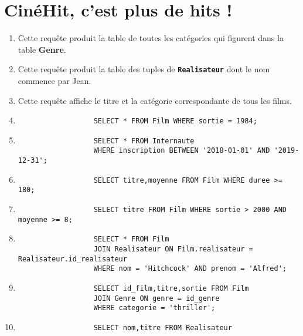 \documentclass[a4paper,10pt,article,firamath]{nsi}
\begin{document}
\section{CinéHit, c'est plus de hits !\hfill}
\begin{enumerate}
      \item Cette requête produit la table de toutes les catégories qui figurent dans la table \textbf{Genre}.       
      \item Cette requête produit la table des tuples de \texttt{\textbf{Realisateur}} dont le nom commence par Jean.
      \item Cette requête affiche le titre et la catégorie correspondante de tous les films.
      \item \begin{verbatim}
                  SELECT * FROM Film WHERE sortie = 1984;
            \end{verbatim}
      \item \begin{verbatim}
                  SELECT * FROM Internaute
                  WHERE inscription BETWEEN '2018-01-01' AND '2019-12-31';
            \end{verbatim}
      \item \begin{verbatim}
                  SELECT titre,moyenne FROM Film WHERE duree >= 180;
            \end{verbatim}
      \item \begin{verbatim}
                  SELECT titre FROM Film WHERE sortie > 2000 AND moyenne >= 8;
            \end{verbatim}
      \item \begin{verbatim}
                  SELECT * FROM Film
                  JOIN Realisateur ON Film.realisateur = Realisateur.id_realisateur
                  WHERE nom = 'Hitchcock' AND prenom = 'Alfred';
            \end{verbatim}
      \item \begin{verbatim}
                  SELECT id_film,titre,sortie FROM Film
                  JOIN Genre ON genre = id_genre
                  WHERE categorie = 'thriller';
            \end{verbatim}
      \item \begin{verbatim}
                  SELECT nom,titre FROM Realisateur

\end{verbatim}
\end{enumerate}
\end{document}
